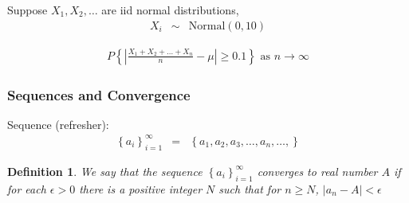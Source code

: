 \documentclass{beamer}
\newtheorem{defn}{Definition}
\numberwithin{equation}{section}
\begin{document}
\begin{frame}
Suppose $X_{1}, X_{2}, \hdots$ are iid normal distributions,
\begin{eqnarray}
X_{i} & \sim & \text{Normal}(0, 10) \nonumber 
\end{eqnarray}

\begin{eqnarray} 
P\left\{ \left| \frac{X_{1} + X_{2} + \hdots + X_{n} }{n} -\mu \right| \geq 0.1 \right\} \text{ as } n \rightarrow \infty\nonumber 
\end{eqnarray}
\pause 





\end{frame}

%
%
%
%
%
%
%



\begin{frame}
\frametitle{Sequences and Convergence} 

Sequence (refresher):\\
\begin{eqnarray}
\left\{a_{i} \right\}_{i=1}^{\infty} & =  & \left\{a_{1}, a_{2}, a_{3}, \hdots, a_{n}, \hdots, \right\} \nonumber 
\end{eqnarray}


\begin{defn}
We say that the sequence $\left\{a_{i} \right\}_{i=1}^{\infty} $ converges to real number $A$ if for each $\epsilon>0$ there is a positive integer $N$ such that for $n\geq N$, $|a_{n} - A| < \epsilon$
\end{defn}


\end{frame}
\end{document}
